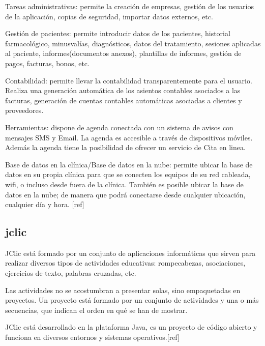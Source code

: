 Tareas administrativas: permite la creación de empresas, gestión de los usuarios de la aplicación, copias de seguridad, importar datos externos, etc.

Gestión de pacientes: permite introducir datos de los pacientes, historial farmacológico, minusvalías, diagnósticos, datos del tratamiento, sesiones aplicadas al paciente, informes(documentos anexos), plantillas de informes, gestión de pagos, facturas, bonos, etc. 

Contabilidad: permite llevar la contabilidad transparentemente para el usuario. Realiza una generación automática de los asientos contables asociados a las facturas, generación de cuentas contables automáticas asociadas a clientes y proveedores. 

Herramientas: dispone de agenda conectada con un sistema de avisos con mensajes SMS y Email. La agenda es accesible a través de dispositivos móviles. Además la agenda tiene la posibilidad de ofrecer un servicio de Cita en linea.

Base de datos en la clínica/Base de datos en la nube: permite ubicar la base de datos en su propia clínica para que se conecten los equipos de su red cableada, wifi, o incluso desde fuera de la clínica. También es posible ubicar la base de datos en la nube; de manera que podrá conectarse desde cualquier ubicación, cualquier día y hora. [ref]


\subsection{jclic}
JClic está formado por un conjunto de aplicaciones informáticas que sirven para realizar diversos tipos de actividades educativas: rompecabezas, asociaciones, ejercicios de texto, palabras cruzadas, etc.

Las actividades no se acostumbran a presentar solas, sino empaquetadas en proyectos. Un proyecto está formado por un conjunto de actividades y una o más secuencias, que indican el orden en qué se han de mostrar.

JClic está desarrollado en la plataforma Java, es un proyecto de código abierto y funciona en diversos entornos y sistemas operativos.[ref]
